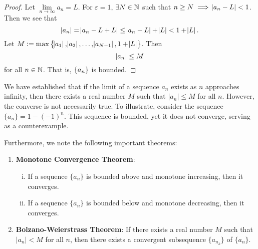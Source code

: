 \documentclass[11pt,openany]{article}
\begin{document}
\newpage
{}
\begin{proof}
	Let $\lim\limits_{n\to\infty}a_n=L$. For $\varepsilon=1$, $\exists N\in\mathbb{N}$ such that $n\geq N\implies\abs{a_n-L}<1$. Then we see that \[
	\abs{a_n}=\abs{a_n-L+L}\leq\abs{a_n-L}+\abs{L}<1+\abs{L}.
	\] Let $M:=\max\set{\abs{a_1},\abs{a_2},\dots,\abs{a_{N-1}},1+\abs{L}}$. Then \[
	\abs{a_n}\leq M
	\] for all $n\in\mathbb{N}$. That is, $\set{a_n}$ is bounded.
\end{proof}
\begin{center}
	
\end{center}
\begin{note}
	We have established that if the limit of a sequence \(a_n\) exists as \(n\) approaches infinity, then there exists a real number \(M\) such that \(\lvert a_n \rvert \leq M\) for all \(n\). However, the converse is not necessarily true. To illustrate, consider the sequence \(\{a_n\} = 1 - (-1)^n\). This sequence is bounded, yet it does not converge, serving as a counterexample.
	
	Furthermore, we note the following important theorems:
	\begin{enumerate}
		\item \textbf{Monotone Convergence Theorem}:
		\begin{enumerate}[(i)]
			\item If a sequence \(\{a_n\}\) is bounded above and monotone increasing, then it converges.
			\item If a sequence \(\{a_n\}\) is bounded below and monotone decreasing, then it converges.
		\end{enumerate}
		\item \textbf{Bolzano-Weierstrass Theorem}: If there exists a real number \(M\) such that \(\lvert a_n \rvert < M\) for all \(n\), then there exists a convergent subsequence \(\{a_{n_k}\}\) of \(\{a_n\}\).
	\end{enumerate}
\end{note}
\end{document}
